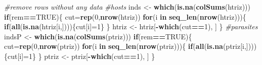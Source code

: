 \documentclass[
]{article}
\newenvironment{Shaded}{\begin{snugshade}}{\end{snugshade}}
\newcommand{\CommentTok}[1]{\textcolor[rgb]{0.56,0.35,0.01}{\textit{#1}}}
\newcommand{\ControlFlowTok}[1]{\textcolor[rgb]{0.13,0.29,0.53}{\textbf{#1}}}
\newcommand{\DecValTok}[1]{\textcolor[rgb]{0.00,0.00,0.81}{#1}}
\newcommand{\KeywordTok}[1]{\textcolor[rgb]{0.13,0.29,0.53}{\textbf{#1}}}
\newcommand{\NormalTok}[1]{#1}
\newcommand{\OperatorTok}[1]{\textcolor[rgb]{0.81,0.36,0.00}{\textbf{#1}}}
\newcommand{\OtherTok}[1]{\textcolor[rgb]{0.56,0.35,0.01}{#1}}
\newcommand{\StringTok}[1]{\textcolor[rgb]{0.31,0.60,0.02}{#1}}
\begin{document}
\begin{Shaded}
\begin{Highlighting}[]
{  \CommentTok{#remove rows without any data}
    \CommentTok{#hosts}
\NormalTok{  inds <-}\StringTok{ }\KeywordTok{which}\NormalTok{(}\KeywordTok{is.na}\NormalTok{(}\KeywordTok{colSums}\NormalTok{(htriz)))}
  \ControlFlowTok{if}\NormalTok{(rem}\OperatorTok{==}\OtherTok{TRUE}\NormalTok{)\{}
\NormalTok{    cut=}\KeywordTok{rep}\NormalTok{(}\DecValTok{0}\NormalTok{,}\KeywordTok{nrow}\NormalTok{(htriz))}
    \ControlFlowTok{for}\NormalTok{(i }\ControlFlowTok{in} \KeywordTok{seq_len}\NormalTok{(}\KeywordTok{nrow}\NormalTok{(htriz)))\{}
      \ControlFlowTok{if}\NormalTok{(}\KeywordTok{all}\NormalTok{(}\KeywordTok{is.na}\NormalTok{(htriz[i,])))\{cut[i]=}\DecValTok{1}\NormalTok{\}}
\NormalTok{    \}}
\NormalTok{    htriz <-}\StringTok{ }\NormalTok{htriz[}\OperatorTok{-}\KeywordTok{which}\NormalTok{(cut}\OperatorTok{==}\DecValTok{1}\NormalTok{), ]}
\NormalTok{  \}}
    \CommentTok{#parasites}
\NormalTok{  indsP <-}\StringTok{ }\KeywordTok{which}\NormalTok{(}\KeywordTok{is.na}\NormalTok{(}\KeywordTok{colSums}\NormalTok{(ptriz)))}
  \ControlFlowTok{if}\NormalTok{(rem}\OperatorTok{==}\OtherTok{TRUE}\NormalTok{)\{}
\NormalTok{    cut=}\KeywordTok{rep}\NormalTok{(}\DecValTok{0}\NormalTok{,}\KeywordTok{nrow}\NormalTok{(ptriz))}
    \ControlFlowTok{for}\NormalTok{(i }\ControlFlowTok{in} \KeywordTok{seq_len}\NormalTok{(}\KeywordTok{nrow}\NormalTok{(ptriz)))\{}
      \ControlFlowTok{if}\NormalTok{(}\KeywordTok{all}\NormalTok{(}\KeywordTok{is.na}\NormalTok{(ptriz[i,])))\{cut[i]=}\DecValTok{1}\NormalTok{\}}
\NormalTok{    \}}
\NormalTok{    ptriz <-}\StringTok{ }\NormalTok{ptriz[}\OperatorTok{-}\KeywordTok{which}\NormalTok{(cut}\OperatorTok{==}\DecValTok{1}\NormalTok{), ]}
\NormalTok{  \}}

}
\end{Highlighting}
\end{Shaded}
\end{document}
